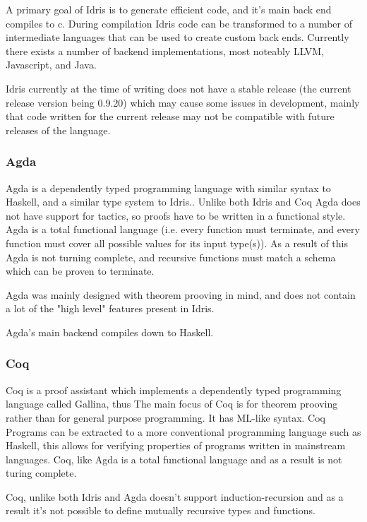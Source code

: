 A primary goal of Idris is to generate efficient code, and it's main back end compiles to c. During compilation
Idris code can be transformed to a number of intermediate languages that can be used to create custom back ends. 
Currently there exists a number of backend implementations, most noteably LLVM, Javascript, and Java.

Idris currently at the time of writing does not have a stable release (the current release version being 0.9.20) which
may cause some issues in development, mainly that code written for the current release may not be compatible with future 
releases of the language.


\subsubsection{Agda}

Agda\cite{agda} is a dependently typed programming language with similar syntax to Haskell, and a similar
type system to Idris..
Unlike both Idris and Coq Agda does not have support for tactics, so proofs have to be written
in a functional style. Agda is a total functional language\cite{total} (i.e. every function must terminate, and every function
must cover all possible values for its input type(s)). As a result of this Agda is not turning complete, and
recursive functions must match a schema which can be proven to terminate.  

Agda was mainly designed with theorem prooving in mind, and does not contain a lot of the "high level" 
features present in Idris.

Agda's main backend compiles down to Haskell.


\subsubsection{Coq}
Coq\cite{coq} is a proof assistant which implements a dependently typed programming language called Gallina, 
thus The main focus of Coq is for theorem prooving rather than for general purpose programming. It has ML-like syntax. 
Coq Programs can be extracted to a more conventional programming language such as Haskell, this allows for verifying properties of programs
written in mainstream languages.
Coq, like Agda is a total functional language and as a result is not turing complete. 

Coq, unlike both Idris and Agda doesn't support induction-recursion\cite{inductionrecur} and as a result it's not
possible to define mutually recursive types and functions.










